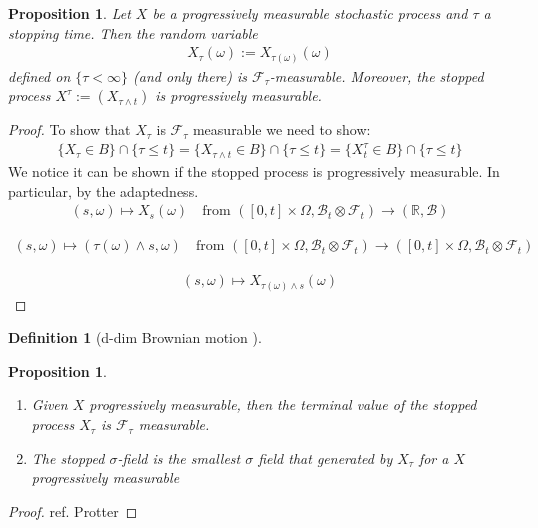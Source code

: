 \documentclass[a4paper,11pt]{book}
\newtheorem{proposition}[theorem]{Proposition}
\theoremstyle{definition}
\newtheorem{definition}{Definition}[section]
\theoremstyle{remark}
\begin{document}
\begin{proposition}
	Let $X$ be a progressively measurable stochastic process and $\tau$ a stopping time. Then the random variable
	\begin{align*}
		X_\tau(\omega) := X_{\tau(\omega)}(\omega)
	\end{align*}
	defined on $\{\tau < \infty\}$ (and only there) is $\mathcal{F}_\tau$-measurable. Moreover, the stopped process $X^\tau := (X_{\tau \wedge t})$ is progressively measurable.
\end{proposition}
\begin{proof}
	To show that $X_\tau$ is $\mathcal{F}_\tau$ measurable we need to show: 
	\begin{align*}
		\{X_\tau \in B\} \cap \{\tau \le t\} = \{X_{\tau \wedge t} \in B\} \cap \{\tau \le t\} = \{X_t^\tau \in B\} \cap \{\tau \le t\}
	\end{align*}
	We notice it can be shown if the stopped process is progressively measurable. In particular, by the adaptedness. 
	\begin{align*}
		(s, \omega) \mapsto X_s(\omega) \quad \text{from } ([0,t] \times \Omega, \mathcal{B}_t \otimes \mathcal{F}_t) \to (\mathbb{R}, \mathcal{B})
	\end{align*}

	\begin{align*}
		(s, \omega) \mapsto (\tau(\omega) \wedge s, \omega) \quad \text{from } ([0,t] \times \Omega, \mathcal{B}_t \otimes \mathcal{F}_t) \to ([0,t] \times \Omega, \mathcal{B}_t \otimes \mathcal{F}_t)
	\end{align*}

	\begin{align*}
		(s, \omega) \mapsto X_{\tau(\omega) \wedge s}(\omega)
	\end{align*}
\end{proof}

\begin{definition}[d-dim Brownian motion ]
	
\end{definition}

\begin{proposition}
\quad
\begin{enumerate}
	\item Given $X$ progressively measurable, then the terminal value of the stopped process $X_\tau$ is $\mathcal{F}_\tau$ measurable. 
	\item The stopped $\sigma$-field is the smallest $\sigma$ field that generated by $X_\tau$ for a $X$ progressively measurable
\end{enumerate}
	
\end{proposition}
\begin{proof}
	ref. Protter 
\end{proof}
\end{document}
